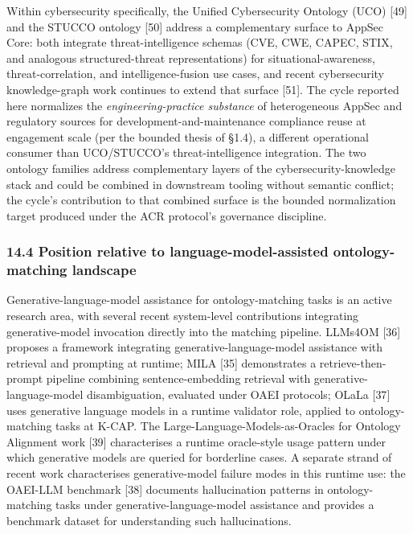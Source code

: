\documentclass[
]{article}
\begin{document}
Within cybersecurity specifically, the Unified Cybersecurity Ontology
(UCO) {[}49{]} and the STUCCO ontology {[}50{]} address a complementary
surface to AppSec Core: both integrate threat-intelligence schemas (CVE,
CWE, CAPEC, STIX, and analogous structured-threat representations) for
situational-awareness, threat-correlation, and intelligence-fusion use
cases, and recent cybersecurity knowledge-graph work continues to extend
that surface {[}51{]}. The cycle reported here normalizes the
\emph{engineering-practice substance} of heterogeneous AppSec and
regulatory sources for development-and-maintenance compliance reuse at
engagement scale (per the bounded thesis of §1.4), a different
operational consumer than UCO/STUCCO's threat-intelligence integration.
The two ontology families address complementary layers of the
cybersecurity-knowledge stack and could be combined in downstream
tooling without semantic conflict; the cycle's contribution to that
combined surface is the bounded normalization target produced under the
ACR protocol's governance discipline.

\subsubsection{14.4 Position relative to language-model-assisted
ontology-matching
landscape}\label{position-relative-to-language-model-assisted-ontology-matching-landscape}

Generative-language-model assistance for ontology-matching tasks is an
active research area, with several recent system-level contributions
integrating generative-model invocation directly into the matching
pipeline. LLMs4OM {[}36{]} proposes a framework integrating
generative-language-model assistance with retrieval and prompting at
runtime; MILA {[}35{]} demonstrates a retrieve-then-prompt pipeline
combining sentence-embedding retrieval with generative-language-model
disambiguation, evaluated under OAEI protocols; OLaLa {[}37{]} uses
generative language models in a runtime validator role, applied to
ontology-matching tasks at K-CAP. The Large-Language-Models-as-Oracles
for Ontology Alignment work {[}39{]} characterises a runtime
oracle-style usage pattern under which generative models are queried for
borderline cases. A separate strand of recent work characterises
generative-model failure modes in this runtime use: the OAEI-LLM
benchmark {[}38{]} documents hallucination patterns in ontology-matching
tasks under generative-language-model assistance and provides a
benchmark dataset for understanding such hallucinations.
\end{document}
